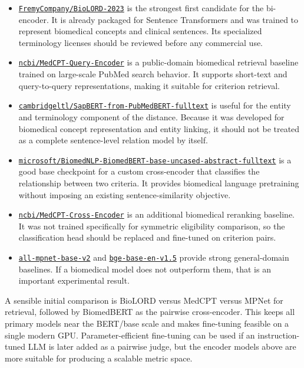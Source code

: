 \documentclass[11pt]{article}
\begin{document}
\begin{itemize}
    \item \href{https://huggingface.co/FremyCompany/BioLORD-2023}{\texttt{FremyCompany/BioLORD-2023}} is the strongest first candidate for the bi-encoder. It is already packaged for Sentence Transformers and was trained to represent biomedical concepts and clinical sentences. Its specialized terminology licenses should be reviewed before any commercial use.
    \item \href{https://huggingface.co/ncbi/MedCPT-Query-Encoder}{\texttt{ncbi/MedCPT-Query-Encoder}} is a public-domain biomedical retrieval baseline trained on large-scale PubMed search behavior. It supports short-text and query-to-query representations, making it suitable for criterion retrieval.
    \item \href{https://huggingface.co/cambridgeltl/SapBERT-from-PubMedBERT-fulltext}{\texttt{cambridgeltl/SapBERT-from-PubMedBERT-fulltext}} is useful for the entity and terminology component of the distance. Because it was developed for biomedical concept representation and entity linking, it should not be treated as a complete sentence-level relation model by itself.
    \item \href{https://huggingface.co/microsoft/BiomedNLP-BiomedBERT-base-uncased-abstract-fulltext}{\texttt{microsoft/BiomedNLP-BiomedBERT-base-uncased-abstract-fulltext}} is a good base checkpoint for a custom cross-encoder that classifies the relationship between two criteria. It provides biomedical language pretraining without imposing an existing sentence-similarity objective.
    \item \href{https://huggingface.co/ncbi/MedCPT-Cross-Encoder}{\texttt{ncbi/MedCPT-Cross-Encoder}} is an additional biomedical reranking baseline. It was not trained specifically for symmetric eligibility comparison, so the classification head should be replaced and fine-tuned on criterion pairs.
    \item \href{https://huggingface.co/sentence-transformers/all-mpnet-base-v2}{\texttt{all-mpnet-base-v2}} and \href{https://huggingface.co/BAAI/bge-base-en-v1.5}{\texttt{bge-base-en-v1.5}} provide strong general-domain baselines. If a biomedical model does not outperform them, that is an important experimental result.
\end{itemize}

A sensible initial comparison is BioLORD versus MedCPT versus MPNet for retrieval, followed by BiomedBERT as the pairwise cross-encoder. This keeps all primary models near the BERT/base scale and makes fine-tuning feasible on a single modern GPU. Parameter-efficient fine-tuning can be used if an instruction-tuned LLM is later added as a pairwise judge, but the encoder models above are more suitable for producing a scalable metric space.
\end{document}
